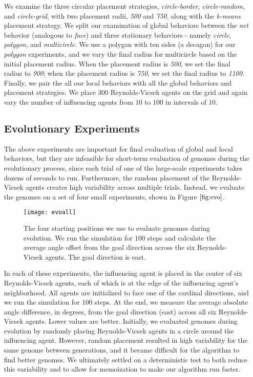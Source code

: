 We examine the three circular placement strategies, \textit{circle-border},
\textit{circle-random}, and \textit{circle-grid}, with two placement radii,
\textit{500} and \textit{750}, along with the \textit{k-means} placement
strategy.
We split our examination of global behaviors between the \textit{net} behavior
(analogous to \textit{face}) and three stationary behaviors - namely
\textit{circle}, \textit{polygon}, and \textit{multicircle}.
We use a polygon with ten sides (a decagon) for our \textit{polygon}
experiments, and we vary the final radius for multicircle based on the initial
placement radius.
When the placement radius is \textit{500}, we set the final radius to
\textit{900}; when the placement radius is \textit{750}, we set the final
radius to \textit{1100}.
Finally, we pair the all our local behaviors with all the global behaviors and
placement strategies.
We place $300$ Reynolds-Vicsek agents on the grid and again vary the number of
influencing agents from $10$ to $100$ in intervals of $10$.

\subsection{Evolutionary Experiments}
The above experiments are important for final evaluation of global and local
behaviors, but they are infeasible for short-term evaluation of genomes during
the evolutionary process, since each trial of one of the large-scale
experiments takes dozens of seconds to run.
Furthermore, the random placement of the Reynolds-Vicsek agents creates high
variability across multiple trials.
Instead, we evaluate the genomes on a set of four small experiments, shown in
Figure $\ref{fig:evo}$.
\begin{figure}
    \centering
    \texttt{[image: evoall]}
    \caption{The four starting positions we use to evaluate genomes during
    evolution.
    We run the simulation for $100$ steps and calculate the average angle offset
    from the goal direction across the six Reynolds-Vicsek agents.
    The goal direction is east.}
    \label{fig:evo}
\end{figure}
In each of these experiments, the influencing agent is placed in the center of
six Reynolds-Vicsek agents, each of which is at the edge of the influencing
agent's neighborhood.
All agents are initialized to face one of the cardinal directions, and we run
the simulation for $100$ steps.
At the end, we measure the average absolute angle difference, in degrees, from
the goal direction (east) across all six Reynolds-Vicsek agents.
Lower values are better.
Initially, we evaluated genomes during evolution by randomly placing
Reynolds-Vicsek agents in a circle around the influencing agent.
However, random placement resulted in high variability for the same genome
between generations, and it became difficult for the algorithm to find better
genomes.
We ultimately settled on a deterministic test to both reduce this variability
and to allow for memoization to make our algorithm run faster.

